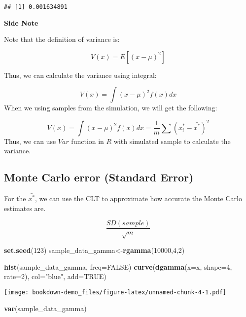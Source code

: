 \documentclass[]{book}
\newenvironment{Shaded}{\begin{snugshade}}{\end{snugshade}}
\newcommand{\KeywordTok}[1]{\textcolor[rgb]{0.13,0.29,0.53}{\textbf{#1}}}
\newcommand{\DataTypeTok}[1]{\textcolor[rgb]{0.13,0.29,0.53}{#1}}
\newcommand{\DecValTok}[1]{\textcolor[rgb]{0.00,0.00,0.81}{#1}}
\newcommand{\StringTok}[1]{\textcolor[rgb]{0.31,0.60,0.02}{#1}}
\newcommand{\OtherTok}[1]{\textcolor[rgb]{0.56,0.35,0.01}{#1}}
\newcommand{\NormalTok}[1]{#1}
\begin{document}
\begin{verbatim}
## [1] 0.001634891
\end{verbatim}

\textbf{Side Note}

Note that the definition of variance is:

\[V(x)=E[(x-\mu)^2]\]

Thus, we can calculate the variance using integral:

\[V(x)=\int (x-\mu)^2 f(x)dx\] When we using samples from the
simulation, we will get the following:

\[V(x)=\int (x-\mu)^2 f(x)dx= \frac{1}{m} \sum (x_i^*-\bar{x^*})^2\]
Thus, we can use \(Var\) function in \(R\) with simulated sample to
calculate the variance.

\subsection{Monte Carlo error (Standard
Error)}\label{monte-carlo-error-standard-error}

For the \(\bar{x^*}\), we can use the CLT to approximate how accurate
the Monte Carlo estimates are.

\[\frac{SD(sample)}{\sqrt{m}}\]

\begin{Shaded}
\begin{Highlighting}[]
\KeywordTok{set.seed}\NormalTok{(}\DecValTok{123}\NormalTok{)}
\NormalTok{sample_data_gamma<-}\KeywordTok{rgamma}\NormalTok{(}\DecValTok{10000}\NormalTok{,}\DecValTok{4}\NormalTok{,}\DecValTok{2}\NormalTok{)}

\KeywordTok{hist}\NormalTok{(sample_data_gamma, }\DataTypeTok{freq=}\OtherTok{FALSE}\NormalTok{)}
\KeywordTok{curve}\NormalTok{(}\KeywordTok{dgamma}\NormalTok{(}\DataTypeTok{x=}\NormalTok{x, }\DataTypeTok{shape=}\DecValTok{4}\NormalTok{, }\DataTypeTok{rate=}\DecValTok{2}\NormalTok{), }\DataTypeTok{col=}\StringTok{"blue"}\NormalTok{, }\DataTypeTok{add=}\OtherTok{TRUE}\NormalTok{)}
\end{Highlighting}
\end{Shaded}

\texttt{[image: bookdown-demo\_files/figure-latex/unnamed-chunk-4-1.pdf]}

\begin{Shaded}
\begin{Highlighting}[]
\KeywordTok{var}\NormalTok{(sample_data_gamma)}
\end{Highlighting}
\end{Shaded}
\end{document}
